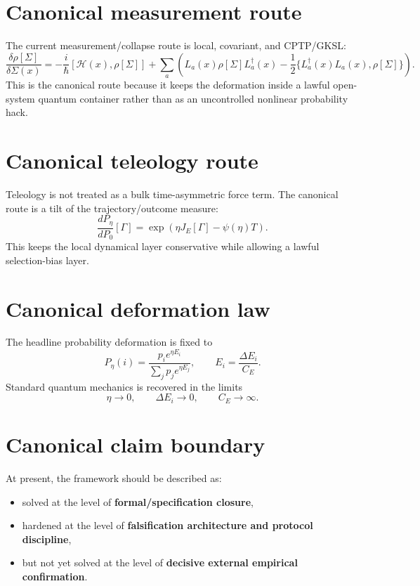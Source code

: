 \documentclass[reprint,amsmath,amssymb,aps,showkeys]{revtex4-2}
\begin{document}
\section*{Canonical measurement route}
The current measurement/collapse route is local, covariant, and CPTP/GKSL:
\[
\frac{\delta \rho[\Sigma]}{\delta \Sigma(x)}
=
-\frac{i}{\hbar}[ \mathcal{H}(x),\rho[\Sigma]]
+
\sum_a \left(
L_a(x)\rho[\Sigma]L_a^\dagger(x)
-\frac12\{L_a^\dagger(x)L_a(x),\rho[\Sigma]\}
\right).
\]
This is the canonical route because it keeps the deformation inside a lawful open-system quantum container rather than as an uncontrolled nonlinear probability hack.

\section*{Canonical teleology route}
Teleology is not treated as a bulk time-asymmetric force term. The canonical route is a tilt of the trajectory/outcome measure:
\[
\frac{dP_\eta}{dP_0}[\Gamma] = \exp\left(\eta J_E[\Gamma]-\psi(\eta)T\right).
\]
This keeps the local dynamical layer conservative while allowing a lawful selection-bias layer.

\section*{Canonical deformation law}
The headline probability deformation is fixed to
\[
P_\eta(i)=\frac{p_i e^{\eta E_i}}{\sum_j p_j e^{\eta E_j}},
\qquad
E_i=\frac{\Delta E_i}{C_E}.
\]
Standard quantum mechanics is recovered in the limits
\[
\eta\to 0,\qquad \Delta E_i\to 0,\qquad C_E\to\infty.
\]

\section*{Canonical claim boundary}
At present, the framework should be described as:
\begin{itemize}
    \item solved at the level of \textbf{formal/specification closure},
    \item hardened at the level of \textbf{falsification architecture and protocol discipline},
    \item but not yet solved at the level of \textbf{decisive external empirical confirmation}.
\end{itemize}
\end{document}
